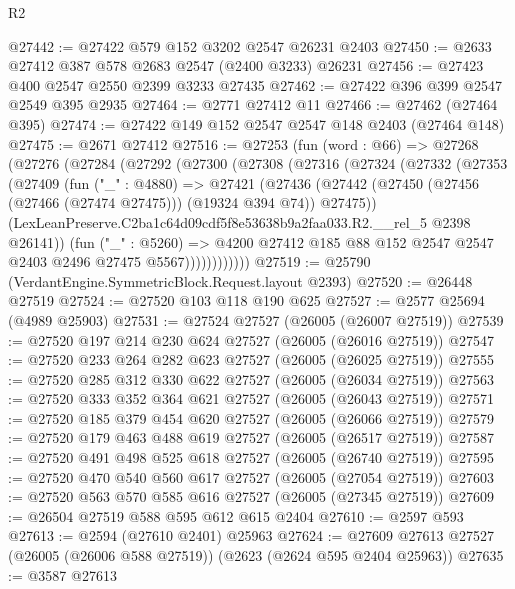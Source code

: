 \begin{lexlean}{R2}
\begin{coremodule}
@27442 := @27422 @579 @152 @3202 @2547 @26231 @2403
@27450 := @2633 @27412 @387 @578 @2683 @2547 (@2400 @3233) @26231
@27456 := @27423 @400 @2547 @2550 @2399 @3233 @27435
@27462 := @27422 @396 @399 @2547 @2549 @395 @2935
@27464 := @2771 @27412 @11
@27466 := @27462 (@27464 @395)
@27474 := @27422 @149 @152 @2547 @2547 @148 @2403 (@27464 @148)
@27475 := @2671 @27412
@27516 := @27253
    (fun (word : @66) =>
    @27268
      (@27276
        (@27284
          (@27292
            (@27300
              (@27308
                (@27316
                  (@27324
                    (@27332
                      (@27353
                        (@27409
                          (fun ("_" : @4880) =>
                          @27421
                            (@27436
                              (@27442
                                (@27450 (@27456 (@27466 (@27474 @27475))) (@19324 @394 @74))
                                @27475))
                            (LexLeanPreserve.C2ba1c64d09cdf5f8e53638b9a2faa033.R2.__rel_5
                              @2398
                              @26141))
                          (fun ("_" : @5260) =>
                          @4200
                            @27412
                            @185
                            @88
                            @152
                            @2547
                            @2547
                            @2403
                            @2496
                            @27475
                            @5567))))))))))))
@27519 := @25790 (VerdantEngine.SymmetricBlock.Request.layout @2393)
@27520 := @26448 @27519
@27524 := @27520 @103 @118 @190 @625
@27527 := @2577 @25694 (@4989 @25903)
@27531 := @27524 @27527 (@26005 (@26007 @27519))
@27539 := @27520 @197 @214 @230 @624 @27527 (@26005 (@26016 @27519))
@27547 := @27520 @233 @264 @282 @623 @27527 (@26005 (@26025 @27519))
@27555 := @27520 @285 @312 @330 @622 @27527 (@26005 (@26034 @27519))
@27563 := @27520 @333 @352 @364 @621 @27527 (@26005 (@26043 @27519))
@27571 := @27520 @185 @379 @454 @620 @27527 (@26005 (@26066 @27519))
@27579 := @27520 @179 @463 @488 @619 @27527 (@26005 (@26517 @27519))
@27587 := @27520 @491 @498 @525 @618 @27527 (@26005 (@26740 @27519))
@27595 := @27520 @470 @540 @560 @617 @27527 (@26005 (@27054 @27519))
@27603 := @27520 @563 @570 @585 @616 @27527 (@26005 (@27345 @27519))
@27609 := @26504 @27519 @588 @595 @612 @615 @2404
@27610 := @2597 @593
@27613 := @2594 (@27610 @2401) @25963
@27624 := @27609 @27613 @27527 (@26005 (@26006 @588 @27519)) (@2623 (@2624 @595 @2404 @25963))
@27635 := @3587
    @27613

\end{coremodule}
\end{lexlean}
